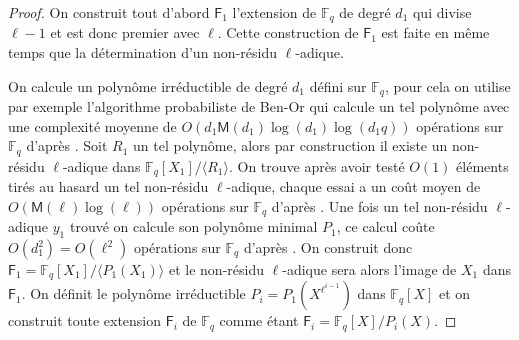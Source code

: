 \documentclass[10pt,a4paper]{book}
\theoremstyle{plain}
\theoremstyle{definition}
\theoremstyle{definition}
\theoremstyle{definition}
\theoremstyle{definition}
\theoremstyle{remark}
\newtheorem{rem}[thm]{Remarque}
\theoremstyle{remark}
\theoremstyle{definition}
\begin{document}
 \begin{proof}
  On construit tout d'abord $\mathsf{F}_1$ l'extension de $\mathbb{F}_q$ de degré $d_1$ qui divise $\ell-1$ et est donc premier avec $\ell$. Cette construction de $\mathsf{F}_1$ est faite en même temps que la détermination d'un non-résidu $\ell$-adique. 

On calcule un polynôme irréductible de degré $d_1$ défini sur $\mathbb{F}_q$, pour cela on utilise par exemple l'algorithme probabiliste de Ben-Or qui calcule un tel polynôme avec une complexité moyenne de $O(d_1\mathsf{M}(d_1)\log(d_1)\log(d_1q))$ opérations sur $\mathbb{F}_q$ d'après \cite[Theorem 14.42]{vzGJG03}.
 Soit $R_1$ un tel polynôme, alors par construction il existe un non-résidu $\ell$-adique dans $\mathbb{F}_q[X_1]/ \langle R_1 \rangle $. On trouve après avoir testé $O(1)$ éléments tirés au hasard un tel non-résidu $\ell$-adique, chaque essai a un coût moyen de $O(\mathsf{M}(\ell)\log(\ell))$ opérations sur $\mathbb{F}_q$ d'après \cite[11.1]{vzGJG03}. Une fois un tel non-résidu $\ell$-adique $y_1$ trouvé on calcule son polynôme minimal $P_1$, ce calcul coûte $O(d_1^2)=O(\ell^2)$ opérations sur $\mathbb{F}_q$ d'après \cite[Th. 3.4]{Shoup93}. On construit donc $\mathsf{F}_1=\mathbb{F}_q[X_1]/\langle P_1(X_1) \rangle$ et le non-résidu $\ell$-adique sera alors l'image de $X_1$ dans $\mathsf{F}_1$. On définit le polynôme irréductible $P_i=P_1(X^{\ell^{i-1}})$ dans $\mathbb{F}_q[X]$ et on construit toute extension $\mathsf{F}_{i}$ de $\mathbb{F}_{q}$ comme étant $\mathsf{F}_{i}=\mathbb{F}_q[X]/P_i(X)$. 
 
\end{proof}

\end{document}

